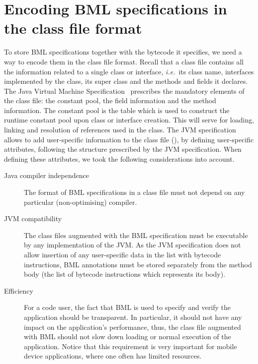 \section{Encoding BML specifications in the class file format}
\label{SecClassfile}

To store BML specifications together with the bytecode it
specifies, we need a way to encode them in the class file
format. Recall that a class file contains all the information related
to a single class or interface, \emph{i.e.}\ its class name, interfaces
implemented by the class, its super class and the methods and fields
it declares. The Java Virtual Machine Specification~\cite{JVMspec}
prescribes the mandatory elements of the class file: the constant
pool, the field information and the method information. The constant
pool is the table which is used to construct the runtime constant pool
upon class or interface creation. This will serve for loading, linking
and resolution of references used in the class. The JVM specification
allows to add user-specific information to the class file
(\cite[\S4.7.1]{JVMspec}), by defining user-specific attributes,
following the structure prescribed by the JVM specification. When
defining these attributes, we took the following considerations into
account.

\begin{description}
\item [Java compiler independence]
The format of BML specifications in a class file must not depend on
any particular (non-optimising) compiler.
    
      
\item [JVM compatibility]
The class files augmented with the BML specification must be
executable by any implementation of the JVM.  As the JVM specification
does not allow insertion of any user-specific data in the list with
bytecode instructions, BML annotations must be stored separately from
the method body (the list of bytecode instructions which represents
its body).

\item[Efficiency]
For a code user, the fact that BML is used to specify and verify the
application should be transparent. In particular, it should not have
any impact on the application's performance, thus, the class file
augmented with BML should not slow down loading or normal execution of
the application. Notice that this requirement is very important for
mobile device applications, where one often has limited resources.
\end{description}	  


